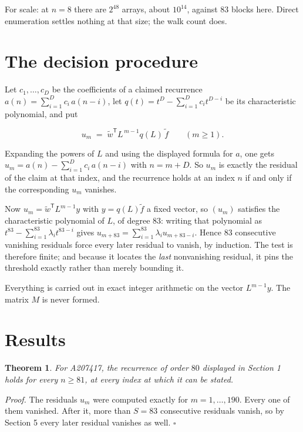 \documentclass[11pt]{article}
\newtheorem{theorem}{Theorem}
\theoremstyle{definition}
\begin{document}
For scale: at $n = 8$ there are $2^{48}$ arrays, about $10^{14}$, against $83$ blocks here. Direct enumeration settles nothing at that size; the walk count does.

\section{The decision procedure}

Let $c_1,\dots,c_D$ be the coefficients of a claimed recurrence $a(n) = \sum_{i=1}^{D} c_i\,a(n-i)$, let $q(t) = t^{D} - \sum_{i=1}^{D} c_i t^{D-i}$ be its characteristic polynomial, and put

\[u_m \;=\; \tilde w^{\mathsf T} L^{\,m-1} q(L)\,\tilde f \qquad (m \ge 1).\]

Expanding the powers of $L$ and using the displayed formula for $a$, one gets $u_m = a(n) - \sum_{i=1}^{D} c_i\,a(n-i)$ with $n = m + D$. So $u_m$ is exactly the residual of the claim at that index, and the recurrence holds at an index $n$ if and only if the corresponding $u_m$ vanishes.

Now $u_m = \tilde w^{\mathsf T} L^{m-1} y$ with $y = q(L)\tilde f$ a fixed vector, so $(u_m)$ satisfies the characteristic polynomial of $L$, of degree $83$: writing that polynomial as $t^{83} - \sum_{i=1}^{83} \lambda_i t^{83-i}$ gives $u_{m+83} = \sum_{i=1}^{83} \lambda_i u_{m+83-i}$. Hence $83$ consecutive vanishing residuals force every later residual to vanish, by induction. The test is therefore finite; and because it locates the {\itshape last} nonvanishing residual, it pins the threshold exactly rather than merely bounding it.

Everything is carried out in exact integer arithmetic on the vector $L^{m-1}y$. The matrix $M$ is never formed.

\section{Results}

\begin{theorem} For A207417, the recurrence of order $80$ displayed in Section 1 holds for every $n \ge 81$, at every index at which it can be stated.\end{theorem}

{\itshape Proof.} The residuals $u_m$ were computed exactly for $m = 1,\dots,190$. Every one of them vanished. After it, more than $S = 83$ consecutive residuals vanish, so by Section 5 every later residual vanishes as well. $\square$
\end{document}
